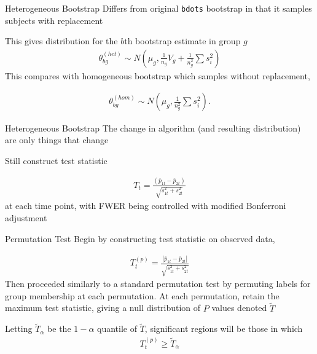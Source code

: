 \documentclass{beamer}
\newcommand{\vp}{\vspace{2mm}}
\newcommand{\xt}{\texttt}
\begin{document}
\begin{frame}{Heterogeneous Bootstrap}
Differs from original \xt{bdots} bootstrap in that it samples subjects with replacement \vp

This gives distribution for the $b$th bootstrap estimate in group $g$
\begin{align*}
\theta_{bg}^{(het)} \sim N \left( \mu_{g}, \frac{1}{n_g} V_{g} + \frac{1}{n_g^2} \sum s_i^2 \right)
\end{align*}
This compares with homogeneous bootstrap which samples without replacement, 

\begin{align*}
\theta^{(hom)}_{bg} \sim N \left( \mu_{g}, \frac{1}{n_g^2} \sum s_i^2 \right).
\end{align*}

\end{frame}

\begin{frame}{Heterogeneous Bootstrap}
The change in algorithm (and resulting distribution) are only things that change \vp

Still construct test statistic

\begin{align*}
T_t = \frac{(\overline{p}_{1t} - \overline{p}_{2t})}{\sqrt{s_{1t}^2 + s_{2t}^2}}
\end{align*}
at each time point, with FWER being controlled with modified Bonferroni adjustment

\end{frame}


\begin{frame}{Permutation Test}
Begin by constructing test statistic on observed data,

\begin{align*}
T_t^{(p)} = \frac{|\overline{p}_{1t} - \overline{p}_{2t}|}{\sqrt{s_{1t}^2 + s_{2t}^2}}
\end{align*}
Then proceeded similarly to a standard permutation test by permuting labels for group membership at each permutation. At each permutation, retain the maximum test statistic, giving a null distribution of $P$ values denoted $\widetilde{T}$ \vp

Letting $\widetilde{T}_{\alpha}$ be the $1 - \alpha$ quantile of $\widetilde{T}$, significant regions will be those in which 
\begin{align*}
T_t^{(p)} \geq \widetilde{T}_{\alpha}
\end{align*}
\end{frame}
\end{document}
